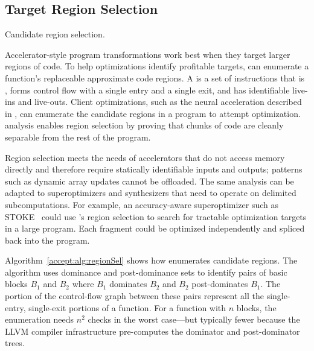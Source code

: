 \subsection{Target Region Selection}
\label{accept:subsec:regions}

\begin{algorithm}[tb]
  \DontPrintSemicolon

   {
     {
    }
  }
\caption{Candidate region selection.}
\label{accept:alg:regionSel}
\end{algorithm}

Accelerator-style program transformations work best when they target larger
regions of code.
To help optimizations identify profitable targets,
\sysname can enumerate a
function's replaceable approximate code regions.
%
A  is a set of instructions that is \precisepure, forms
control flow with a single entry and a single exit, and has identifiable live-ins
and live-outs.
%
Client optimizations, such as the neural acceleration described in
, can enumerate the candidate regions in a program to attempt
optimization.  \Precisepurity analysis enables region selection by proving
that chunks of code are cleanly separable from the rest of the program.

Region selection meets the needs of accelerators that do not access memory
directly and therefore require statically identifiable inputs and outputs;
patterns such as dynamic array updates cannot be offloaded.  The same analysis
can be adapted to superoptimizers and synthesizers that need to operate on
delimited subcomputations.
%
For example, an accuracy-aware superoptimizer such as
STOKE~\cite{stoke-fp} could use \sysname's region selection to search for
tractable optimization targets in a large program.
Each fragment could be optimized independently
and spliced back into the program.

Algorithm~\ref{accept:alg:regionSel} shows how \sysname enumerates candidate regions.
The algorithm uses dominance and post-dominance sets to
identify pairs of basic blocks $B_1$ and $B_2$
where $B_1$ dominates $B_2$ and $B_2$ post-dominates $B_1$.
The portion of the control-flow graph between these pairs represent all the
single-entry, single-exit portions of a function.
For a function with $n$ blocks, the enumeration needs $n^2$ \precisepurity
checks in the worst case---but typically fewer because the LLVM compiler
infrastructure pre-computes the dominator and post-dominator trees.


